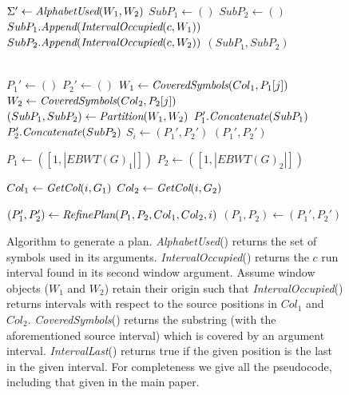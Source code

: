 \renewcommand{\algorithmiccomment}[1]{\hskip0em$\triangleright$ #1}
\begin{figure}
	
	\begin{algorithmic}
		\State $\Sigma' \leftarrow \emph{AlphabetUsed}(W_1,W_2)$
		\State $SubP_1 \leftarrow ()$
		\State $SubP_2 \leftarrow ()$
		\State $SubP_1.\emph{Append}(\emph{IntervalOccupied}(c, W_1))$
		\State $SubP_2.\emph{Append}(\emph{IntervalOccupied}(c, W_2))$
		\EndFor
		\State \Return $(SubP_1, SubP_2)$
		\EndProcedure
		
		\\
		\State $P_1' \leftarrow ()$
		\State $P_2' \leftarrow ()$
		\State {}
		\State {}
		\State $W_1 \leftarrow \emph{CoveredSymbols}(Col_1, P_1[j])$
		\State $W_2 \leftarrow \emph{CoveredSymbols}(Col_2, P_2[j])$
		\State {}
		\State $(SubP_1, SubP_2) \leftarrow \emph{Partition}(W_1, W_2)$
		\State $P_1'.\emph{Concatenate}(SubP_1)$
		\State $P_2'.\emph{Concatenate}(SubP_2)$
		\EndFor
		\State {}
		\State $S_{i} \leftarrow (P_1', P_2')$
		\EndIf
		\State \Return $(P_1', P_2')$
		\EndProcedure
		\\
		\State {}
		
		\State $P_1 \leftarrow ([1, |EBWT(G)_1|])$
		\State $P_2 \leftarrow ([1, |EBWT(G)_2|])$
		
		\State {}
		\State $Col_1 \leftarrow \emph{GetCol}(i, G_1)$
		\State $Col_2 \leftarrow \emph{GetCol}(i, G_2)$
		
		\State $(P_1', P_2') \leftarrow \emph{RefinePlan}(P_1, P_2, Col_1, Col_2, i)$
		\State $(P_1, P_2) \leftarrow (P_1', P_2')$
		\EndFor
		\EndProcedure
	\end{algorithmic}
	
	\caption{Algorithm to generate a plan.  \emph{AlphabetUsed}() returns the set of symbols used in its arguments. \emph{IntervalOccupied}() returns the $c$ run interval found in its second window argument. Assume window objects ($W_1$ and $W_2$) retain their origin such that \emph{IntervalOccupied}() returns intervals with respect to the source positions in $Col_1$ and $Col_2$. \emph{CoveredSymbols}() returns the substring (with the aforementioned source interval) which is covered by an argument interval. \emph{IntervalLast}() returns true if the given position is the last in the given interval.  For completeness we give all the pseudocode, including that given in the main paper.} \label{alg:mergeplan2}
\end{figure}

